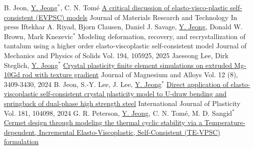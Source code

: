
\begin{cventries}
  \cventry
  {B. Jeon, \underline{Y. Jeong}$^*$, C. N. Tom\'{e}}
  {\href{https://doi.org/10.1016/j.jmrt.2024.11.043}{A critical discussion of elasto-visco-plastic self-consistent (EVPSC) models}}
  {Journal of Materials Research and Technology}
  {In press}
  {
  }
  \cventry
  {Iftekhar A. Riyad, Bjorn Clausen, Daniel J. Savage, \underline{Y. Jeong}, Donald W. Brown, Mark Knezevic$^*$}
  {Modeling deformation, recovery, and recrystallization of tantalum using a higher order elasto-viscoplastic self-consistent model}
  {Journal of Mechanics and Physics of Solids}
  {Vol. 194, 105925, 2025}
  {
  }
  \cventry
  {Jaeseong Lee, Dirk Steglich, \underline{Y. Jeong}$^*$}
  {\href{https://doi.org/10.1016/j.jma.2024.08.009}{Crystal plasticity finite element simulations on extruded Mg-10Gd rod with texture gradient}}
  {Journal of Magnesium and Alloys}
  {Vol. 12 (8), 3409-3430, 2024}
  {
  }
  \cventry
  {B. Jeon, S.-Y. Lee, J. Lee, \underline{Y. Jeong}$^*$}
  {\href{https://doi.org/10.1016/j.ijplas.2024.104098}{Direct application of elasto-viscoplastic self-consistent crystal plasticity model to U-draw bending and springback of dual-phase high strength steel}}
  {International Journal of Plasticity}
  {Vol. 181, 104098, 2024}
  {
  }
  \cventry
  {G. R. Peterson, \underline{Y. Jeong}, C. N. Tom\'{e}, M. D. Sangid$^*$}
  {\href{https://doi.org/10.1016/j.ijplas.2024.104032}{Cermet design through modeling the thermal cyclic stability via a Temperature- dependent, Incremental Elasto-Viscoplastic, Self-Consistent (TE-VPSC) formulation}}

\end{cventries}
